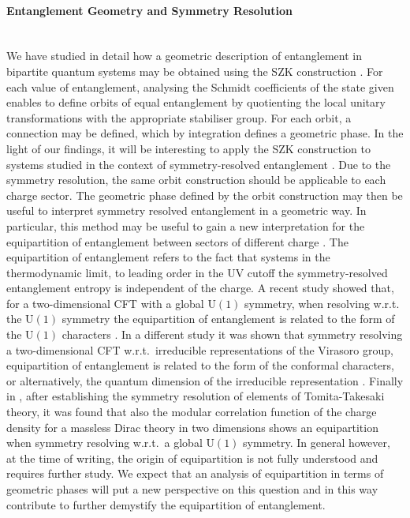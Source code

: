 \documentclass[a4paper,11pt]{article}
\newcommand{\U}{\text{U}}
\newcommand{\1}{\mathds{1}}
\begin{document}
\paragraph{Entanglement Geometry and Symmetry Resolution}~\\
We have studied in detail how a geometric description of entanglement in bipartite quantum systems may be obtained using the SZK construction \cite{Sinolecka2002manifolds}. For each value of entanglement, analysing the Schmidt coefficients of the state given enables to define orbits of equal entanglement by quotienting the local unitary transformations with the appropriate stabiliser group. For each orbit, a connection may be defined, which by integration defines a geometric phase. In the light of our findings, it will be interesting to apply the SZK construction \cite{Sinolecka2002manifolds} to systems studied in the context of symmetry-resolved entanglement \cite{Goldstein:2017bua,Xavier:2018kqb}. Due to the symmetry resolution, the same orbit construction should be applicable to each charge sector. The geometric phase defined by the orbit construction may then be useful to interpret symmetry resolved entanglement in a geometric way. In particular, this method may be useful to gain a new interpretation for the equipartition of entanglement between sectors of different charge \cite{Xavier:2018kqb}. The equipartition of entanglement refers to the fact that systems in the thermodynamic limit, to leading order in the UV cutoff the symmetry-resolved entanglement entropy is independent of the charge. A recent study showed that, for a two-dimensional CFT with a global $\U(1)$ symmetry, when resolving w.r.t. the $\U(1)$ symmetry the equipartition of entanglement is related to the form of the $\U(1)$ characters \cite{DiGiulio:2022jjd}. In a different study it was shown that symmetry resolving a two-dimensional CFT w.r.t.~irreducible representations of the Virasoro group, equipartition of entanglement is related to the form of the conformal characters, or alternatively, the quantum dimension of the irreducible representation \cite{Northe:2023khz}. Finally in \cite{DiGiulio:2023nvz}, after establishing the symmetry resolution of elements of Tomita-Takesaki theory, it was found that also the modular correlation function of the charge density for a massless Dirac theory in two dimensions shows an equipartition when symmetry resolving w.r.t.~a global $\U(1)$ symmetry. In general however, at the time of writing, the origin of equipartition is not fully understood and requires further study. We expect that an analysis of equipartition in terms of geometric phases will put a new perspective on this question and in this way contribute to further demystify the equipartition of entanglement.
\end{document}
